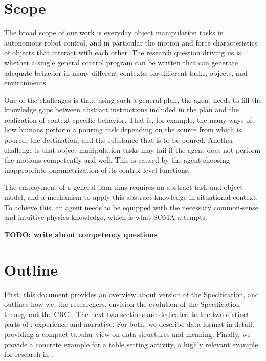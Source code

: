 
\section{Scope} %
\label{sec:scope}

The broad scope of our work is everyday object manipulation tasks in autonomous robot control, and in particular the motion and force characteristics of objects that interact with each other.
The research question driving us is whether a single general control program can be written that can generate adequate behavior in many different contexts: for different tasks, objects, and environments.

One of the challenges is that, using such a general plan, the agent needs to fill the knowledge gaps between abstract instructions included in the plan and the realization of context specific behavior. That is, for example, the many ways of how humans perform a pouring task depending on the source from which is poured, the destination, and the substance that is to be poured.
Another challenge is that object manipulation tasks may fail if the agent does not perform the motions competently and well. This is caused by the agent choosing inappropriate parametrization of its control-level functions.

The employment of a general plan thus requires an abstract task and object model, and a mechanism to apply this abstract knowledge in situational context.
To achieve this, an agent needs to be equipped with the necessary common-sense and intuitive physics knowledge, which is what SOMA attempts.

\textbf{TODO: write about competency questions}

\section{Outline} %
First, this document provides an overview about version \neemversion of the \neem Specification,
and outlines how we, the \ease researchers, envision the evolution of the \neem Specification
throughout the CRC \ease.
The next two sections are dedicated to the two distinct parts of \neems: experience and narrative.
For both, we describe data format in detail, providing
a compact tabular view on data structures and meaning.
Finally, we provide a concrete example for a table setting activity,
a highly relevant example for research in \ease.

